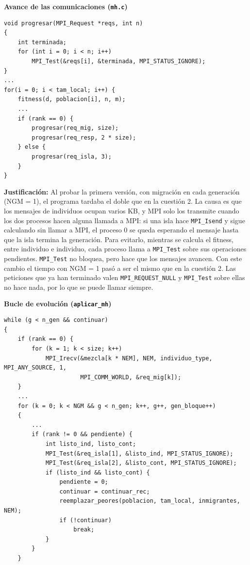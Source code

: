 \documentclass[12pt]{article}
\begin{document}
\begin{enumerate}

\medskip
\noindent\textbf{Avance de las comunicaciones (\texttt{mh.c})}\par
\smallskip

\begin{lstlisting}[style=EstiloC]
void progresar(MPI_Request *reqs, int n)
{
	int terminada;
	for (int i = 0; i < n; i++)
		MPI_Test(&reqs[i], &terminada, MPI_STATUS_IGNORE);
}
...
for(i = 0; i < tam_local; i++) {
	fitness(d, poblacion[i], n, m);
	...
	if (rank == 0) {
		progresar(req_mig, size);
		progresar(req_resp, 2 * size);
	} else {
		progresar(req_isla, 3);
	}
}
\end{lstlisting}

\textbf{Justificación:} Al probar la primera versión, con migración en cada generación (NGM = 1), el programa tardaba el doble que en la cuestión 2. La causa es que los mensajes de individuos ocupan varios KB, y MPI solo los transmite cuando los dos procesos hacen alguna llamada a MPI: si una isla hace \texttt{MPI\_Isend} y sigue calculando sin llamar a MPI, el proceso 0 se queda esperando el mensaje hasta que la isla termina la generación. Para evitarlo, mientras se calcula el fitness, entre individuo e individuo, cada proceso llama a \texttt{MPI\_Test} sobre sus operaciones pendientes. \texttt{MPI\_Test} no bloquea, pero hace que los mensajes avancen. Con este cambio el tiempo con NGM = 1 pasó a ser el mismo que en la cuestión 2. Las peticiones que ya han terminado valen \texttt{MPI\_REQUEST\_NULL} y \texttt{MPI\_Test} sobre ellas no hace nada, por lo que se puede llamar siempre.

\vspace{0.5cm}


\medskip
\noindent\textbf{Bucle de evolución (\texttt{aplicar\_mh})}\par
\smallskip

\begin{lstlisting}[style=EstiloC]
while (g < n_gen && continuar)
{
	if (rank == 0) {
		for (k = 1; k < size; k++)
			MPI_Irecv(&mezcla[k * NEM], NEM, individuo_type, MPI_ANY_SOURCE, 1,
					  MPI_COMM_WORLD, &req_mig[k]);
	}
	...
	for (k = 0; k < NGM && g < n_gen; k++, g++, gen_bloque++)
	{
		...
		if (rank != 0 && pendiente) {
			int listo_ind, listo_cont;
			MPI_Test(&req_isla[1], &listo_ind, MPI_STATUS_IGNORE);
			MPI_Test(&req_isla[2], &listo_cont, MPI_STATUS_IGNORE);
			if (listo_ind && listo_cont) {
				pendiente = 0;
				continuar = continuar_rec;
				reemplazar_peores(poblacion, tam_local, inmigrantes, NEM);
				if (!continuar)
					break;
			}
		}
	}


\end{lstlisting}
\end{enumerate}
\end{document}
